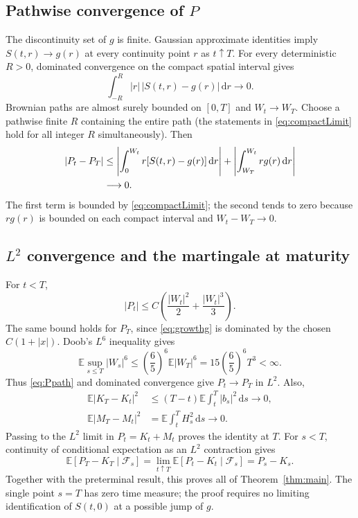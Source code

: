 \documentclass[11pt,letterpaper]{article}
\newcommand{\E}{\mathbb E}
\newcommand{\F}{\mathcal F}
\newcommand{\dd}{\,\mathrm d}
\begin{document}
\subsection*{Pathwise convergence of $P$}
The discontinuity set of $g$ is finite. Gaussian approximate identities imply $S(t,r)\to g(r)$ at every continuity point $r$ as $t\uparrow T$. For every deterministic $R>0$, dominated convergence on the compact spatial interval gives
\begin{equation}\label{eq:compactLimit}
\int_{-R}^R|r|\,|S(t,r)-g(r)|\dd r\longrightarrow0.
\end{equation}
Brownian paths are almost surely bounded on $[0,T]$ and $W_t\to W_T$. Choose a pathwise finite $R$ containing the entire path (the statements in \eqref{eq:compactLimit} hold for all integer $R$ simultaneously). Then
\begin{align}
|P_t-P_T|
&\le\left|\int_0^{W_t}r[S(t,r)-g(r)]\dd r\right|
+\left|\int_{W_T}^{W_t}rg(r)\dd r\right|\notag\\
&\longrightarrow0.\label{eq:Ppath}
\end{align}
The first term is bounded by \eqref{eq:compactLimit}; the second tends to zero because $rg(r)$ is bounded on each compact interval and $W_t-W_T\to0$.

\subsection*{\texorpdfstring{$L^2$}{L2} convergence and the martingale at maturity}
For $t<T$,
\begin{equation}
|P_t|\le C\left(\frac{|W_t|^2}{2}+\frac{|W_t|^3}{3}\right).
\end{equation}
The same bound holds for $P_T$, since \eqref{eq:growthg} is dominated by the chosen $C(1+|x|)$. Doob's $L^6$ inequality gives
\begin{equation}
\E\sup_{s\le T}|W_s|^6
\le\left(\frac65\right)^6\E|W_T|^6
=15\left(\frac65\right)^6T^3<\infty.
\end{equation}
Thus \eqref{eq:Ppath} and dominated convergence give $P_t\to P_T$ in $L^2$. Also,
\begin{align}
\E|K_T-K_t|^2&\le(T-t)\E\int_t^T|b_s|^2\dd s\longrightarrow0,\\
\E|M_T-M_t|^2&=\E\int_t^TH_s^2\dd s\longrightarrow0.
\end{align}
Passing to the $L^2$ limit in $P_t=K_t+M_t$ proves the identity at $T$.
For $s<T$, continuity of conditional expectation as an $L^2$ contraction gives
\begin{equation}
\E[P_T-K_T\mid\F_s]
=\lim_{t\uparrow T}\E[P_t-K_t\mid\F_s]
=P_s-K_s.
\end{equation}
Together with the preterminal result, this proves all of Theorem~\ref{thm:main}. The single point $s=T$ has zero time measure; the proof requires no limiting identification of $S(t,0)$ at a possible jump of $g$.
\end{document}
